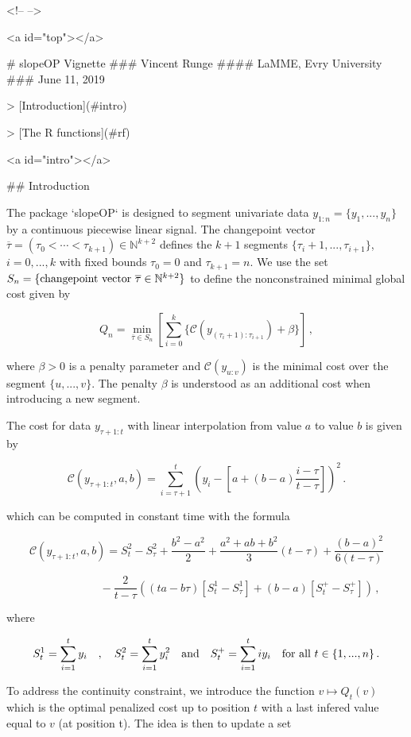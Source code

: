 <!--
-->


<a id="top"></a>

# slopeOP Vignette
### Vincent Runge
#### LaMME, Evry University
### June 11, 2019

> [Introduction](#intro)

> [The R functions](#rf)

<a id="intro"></a>

## Introduction

The package `slopeOP` is designed to segment univariate data $y_{1:n} = \{y_1,...,y_n\}$ by a continuous piecewise linear signal. The changepoint vector $\overline{\tau} = (\tau_0 < \cdots < \tau_{k+1}) \in \mathbb{N}^{k+2}$ defines the $k+1$ segments $\{\tau_i+1,...,\tau_{i+1}\}$, $i = 0,...,k$ with fixed bounds $\tau_0 = 0$ and  $\tau_{k+1} = n$. We use the set $S_n = \{\hbox{changepoint vector } \overline{\tau} \in \mathbb{N}^{k+2}\}$ to define the nonconstrained minimal global cost given by

$$Q_n = \min_{\overline{\tau} \in S_n}\left[ \sum_{i=0}^{k}\lbrace \mathcal{C}(y_{(\tau_i+1):\tau_{i+1}}) + \beta \rbrace \right]\,,$$

where $\beta > 0$ is a penalty parameter and $\mathcal{C}(y_{u:v})$ is the minimal cost over the segment $\{u,...,v\}$. The penalty $\beta$ is understood as an additional cost when introducing a new segment.

The cost for data $y_{\tau+1:t}$ with linear interpolation from value $a$ to value $b$ is given by

$$
\mathcal{C}(y_{\tau+1:t},a,b) = \sum_{i=\tau+1}^{t}\left(y_i - [a + (b-a)\frac{i-\tau}{t-\tau}]\right)^2\,.
$$

which can be computed in constant time with the formula

$$\mathcal{C}(y_{\tau+1:t},a,b) = S_{t}^2 - S_{\tau}^2 +\frac{b^2-a^2}{2} + \frac{a^2 + ab +b^2}{3}(t-\tau) + \frac{(b-a)^2}{6(t-\tau)}$$

$$\quad\quad\quad\quad\quad\quad - \frac{2}{t-\tau} \left( (ta-b\tau)[S_{t}^1 - S_{\tau}^1] + (b-a)[S_{t}^+ - S_{\tau}^+]\right)\,,$$

where

$$
S^1_t = \sum_{i=1}^t y_i\quad , \quad S^2_t = \sum_{i=1}^t y_i^2\quad \hbox{and} \quad S^+_t = \sum_{i=1}^t iy_i\quad \hbox{for all} \,\, t \in \{1,...,n\}\,.
$$

To address the continuity constraint, we introduce the function $v \mapsto Q_t(v)$ which is the optimal penalized cost up to position $t$ with a last infered value equal to $v$ (at position t). The idea is then to update a set


